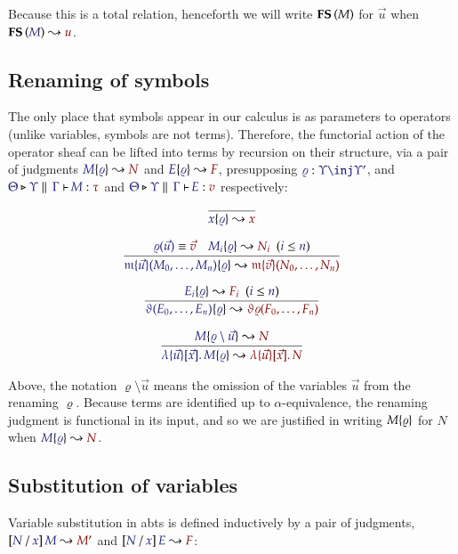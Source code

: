 \documentclass[11pt]{article}
\theoremstyle{definition}
\theoremstyle{remark}
\numberwithin{equation}{section}
\newcommand\CalcFS[2]{
  \FS{\IMode{#1}}\leadsto \OMode{#2}
}
\begin{document}
Because this is a total relation, henceforth we will write $\mathbf{FS}\left(M\right)$ for
$\vec{u}$ when $\CalcFS{M}{u}$.


\subsection{Renaming of symbols}

The only place that symbols appear in our calculus is as parameters to operators
(unlike variables, symbols are not terms). Therefore, the functorial action of
the operator sheaf can be lifted into terms by recursion on their
structure, via a pair of judgments $\IsRenaming{\varrho}{M}{N}$ and
$\IsRenaming{\varrho}{E}{F}$, presupposing $\Of{\varrho}{\Upsilon\inj\Upsilon'}$,
and $\IsAbt{\Theta}{\Upsilon}{\Gamma}{M}{\tau}$ and
$\IsAbt{\Theta}{\Upsilon}{\Gamma}{E}{v}$ respectively:

\begin{gather*}
  \infer{
    \IsRenaming{\varrho}{x}{x}
  }{
  }
\\[6pt]
  \infer{
    \IsRenaming{\varrho}{
      \MApp{\MV{m}}{\vec{u}}{M_0,\dots,M_n}
    }{
      \MApp{\MV{m}}{\vec{v}}{N_0,\dots,N_n}
    }
  }{
    \Match{\varrho(\vec{u})}{\vec{v}}
&
    \HypJ{
      \IsRenaming{\varrho}{M_i}{N_i}
    }{
      \Leq{i}{n}
    }
  }
\\[6pt]
  \infer{
    \IsRenaming{\varrho}{
      \App{\vartheta}{E_0,\dots,E_n}
    }{
      \App{\vartheta\varrho}{F_0,\dots,F_n}
    }
  }{
    \HypJ{
      \IsRenaming{\varrho}{E_i}{F_i}
    }{
      \Leq{i}{n}
    }
  }
\\[6pt]
  \infer{
    \IsRenaming{\varrho}{
      \MkBTm{\vec{u}}{\vec{x}}{M}
    }{
      \MkBTm{\vec{u}}{\vec{x}}{N}
    }
  }{
    \IsRenaming{\varrho\setminus\vec{u}}{M}{N}
  }
\end{gather*}

Above, the notation $\varrho\setminus\vec{u}$ means the omission of the
variables $\vec{u}$ from the renaming $\varrho$. Because terms are identified up
to $\alpha$-equivalence, the renaming judgment is functional in its input, and
so we are justified in writing $M\{\varrho\}$ for $N$ when
$\IsRenaming{\varrho}{M}{N}$.

\subsection{Substitution of variables}

Variable substitution in abts is defined inductively by a pair of judgments,
$\IsSubst{N}{x}{M}{M'}$ and $\IsSubst{N}{x}{E}{F}$:
\end{document}
